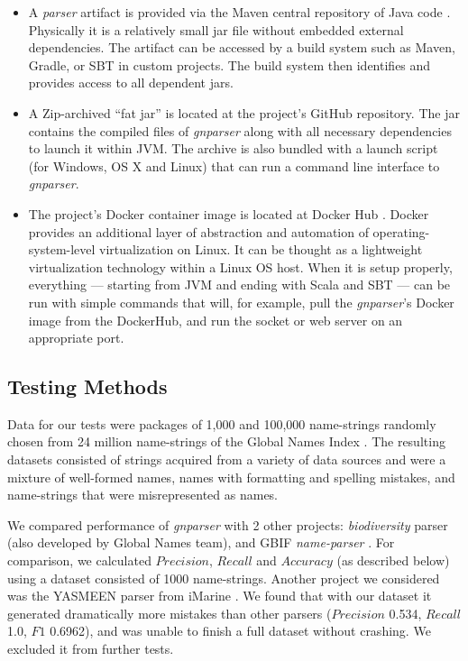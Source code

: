 \documentclass{bmcart}
\begin{document}
\begin{itemize}
  \item A \textit{parser} artifact is provided via the Maven central repository
    of Java code \cite{maven-globalnames}. Physically it is a relatively small
    jar file without embedded external dependencies. The artifact can be
    accessed by a build system such as Maven, Gradle, or SBT in custom
    projects. The build system then identifies and provides access to all
    dependent jars.

  \item A Zip-archived ``fat jar'' is located at the project's GitHub
    repository. The jar contains the compiled files of \textit{gnparser} along
    with all necessary dependencies to launch it within JVM\@. The archive is
    also bundled with a launch script (for Windows, OS X and Linux) that can
    run a command line interface to \textit{gnparser}.

  \item The project's Docker container image is located at Docker Hub
    \cite{gnparser-docker}.  Docker provides an additional layer of abstraction
    and automation of operating-system-level virtualization on Linux. It can be
    thought as a lightweight virtualization technology within a Linux OS host.
    When it is setup properly, everything --- starting from JVM and ending with
    Scala and SBT --- can be run with simple commands that will, for example,
    pull the \textit{gnparser}'s Docker image from the DockerHub, and run the
    socket or web server on an appropriate port.

\end{itemize}

\subsection*{Testing Methods}

Data for our tests were packages of 1,000 and 100,000 name-strings randomly
chosen from 24 million name-strings of the Global Names Index \cite{gn:index}.
The resulting datasets consisted of strings acquired from a variety of data
sources and were a mixture of well-formed names, names with formatting and
spelling mistakes, and name-strings that were misrepresented as names.

We compared performance of \textit{gnparser} with 2 other projects:
\textit{biodiversity} parser \cite{Boyle2013, biodiversity} (also developed by
Global Names team), and GBIF \textit{name-parser} \cite{gbifNameParser}. For
comparison, we calculated $Precision$, $Recall$ and $Accuracy$ (as described
below) using a dataset consisted of 1000 name-strings. Another project we
considered was the YASMEEN parser from iMarine  \cite{VandenBerghe2015}. We
found that with our dataset it generated dramatically more mistakes than other
parsers ($Precision$ 0.534, $Recall$ 1.0, $F1$ 0.6962), and was unable to
finish a full dataset without crashing. We excluded it from further tests.
\end{document}
